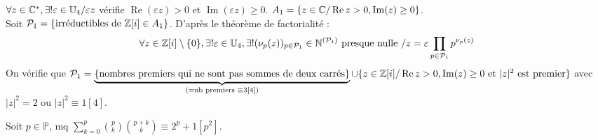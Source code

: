 \begin{solution}
\begin{remarkbox}
$\forall z \in \mathbb C^*, \exists! \varepsilon \in \mathbb{U}_4 / \varepsilon z$ vérifie $\operatorname{Re}(\varepsilon z) > 0$ et $\operatorname{Im}(\varepsilon z) \geq 0$.
$A_1 = \{z \in \mathbb C / \operatorname{Re} z > 0, \operatorname{Im}(z) \geq 0\}$. \\
Soit $\mathcal{P}_1 = \{\text{irréductibles de } \mathbb Z[i] \in A_1\}$. D'après le théorème de factorialité :
\[ \forall z \in \mathbb Z[i] \setminus \{0\}, \exists! \varepsilon \in \mathbb{U}_4, \exists! (\nu_p(z))_{p \in \mathcal{P}_1} \in \mathbb N^{(\mathcal{P}_1)} \text{ presque nulle } / z = \varepsilon \prod_{p \in \mathcal{P}_1} p^{\nu_p(z)} \]
On vérifie que $\mathcal{P}_1 = \underbrace{\{\text{nombres premiers qui ne sont pas sommes de deux carrés}\}}_{(= \text{nb premiers } \equiv 3 [4])} \cup \{z \in \mathbb Z[i] / \operatorname{Re} z > 0, \operatorname{Im}(z) \geq 0 \text{ et } |z|^2 \text{ est premier}\}$ avec $|z|^2 = 2$ ou $|z|^2 \equiv 1 [4]$.
\end{remarkbox}
\end{solution}


\begin{statementbox}
Soit $p \in \mathbb{P}$, mq $\sum_{k=0}^p \binom{p}{k}\binom{p+k}{k} \equiv 2^p + 1 [p^2]$.
\end{statementbox}

